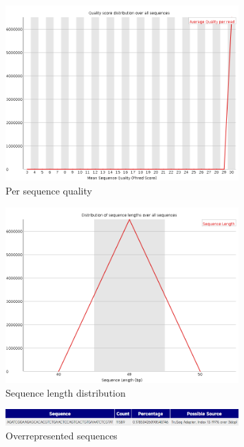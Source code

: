 \documentclass[UTF8]{ctexart}
\begin{document}
\begin{figure}[!htb]
	\centering
	\includegraphics[width=0.8\textwidth]{img/SRR14325859_FastQC_Origin_img/per_sequence_quality.png}	
	\caption{Per sequence quality\protect}    
\end{figure}

\begin{figure}[!htb]
	\centering
	\includegraphics[width=0.8\textwidth]{img/SRR14325859_FastQC_Origin_img/sequence_length_distribution.png}	
	\caption{Sequence length distribution\protect}    
\end{figure}

\begin{figure}[!htb]
	\centering
	\includegraphics[width=0.8\textwidth]{img/SRR14325859_FastQC_Origin_img/overrepresented_sequences.png}	
	\caption{Overrepresented sequences\protect}    
\end{figure}
\end{document}
